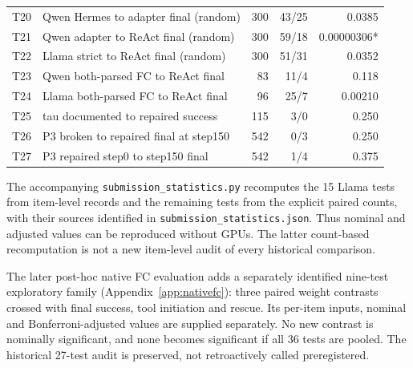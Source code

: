\begin{center}
\begin{longtable}{@{}lp{.49\linewidth}rrr@{}}
T20 & Qwen Hermes to adapter final (random) & 300 & 43/25 & 0.0385 \\
T21 & Qwen adapter to ReAct final (random) & 300 & 59/18 & 0.00000306* \\
T22 & Llama strict to ReAct final (random) & 300 & 51/31 & 0.0352 \\
T23 & Qwen both-parsed FC to ReAct final & 83 & 11/4 & 0.118 \\
T24 & Llama both-parsed FC to ReAct final & 96 & 25/7 & 0.00210 \\
T25 & tau documented to repaired success & 115 & 3/0 & 0.250 \\
T26 & P3 broken to repaired final at step150 & 542 & 0/3 & 0.250 \\
T27 & P3 repaired step0 to step150 final & 542 & 1/4 & 0.375 \\
\bottomrule
\end{longtable}
\end{center}
The accompanying \texttt{submission\_statistics.py} recomputes the 15 Llama tests from
item-level records and the remaining tests from the explicit paired counts, with their sources
identified in \texttt{submission\_statistics.json}. Thus nominal and adjusted values can be
reproduced without GPUs. The latter count-based recomputation is not a new item-level audit
of every historical comparison.

The later post-hoc native FC evaluation adds a separately identified nine-test
exploratory family (Appendix~\ref{app:nativefc}): three paired weight contrasts
crossed with final success, tool initiation and rescue. Its per-item inputs,
nominal and Bonferroni-adjusted values are supplied separately. No new contrast
is nominally significant, and none becomes significant if all 36 tests are pooled.
The historical 27-test audit is preserved, not retroactively called preregistered.
